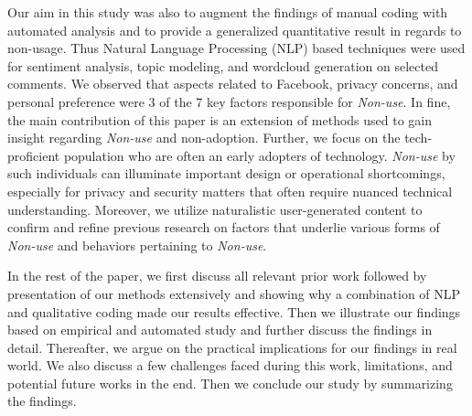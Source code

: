 Our aim in this study was also to augment the findings of manual coding with automated analysis and to provide a generalized quantitative result in regards to non-usage. Thus Natural Language Processing (NLP) based techniques were used for sentiment analysis, topic modeling, and wordcloud generation on selected comments. We observed that aspects related to Facebook, privacy concerns, and personal preference were 3 of the 7 key factors responsible for \emph{Non-use}. In fine, the main contribution of this paper is an extension of methods used to gain insight regarding \textit{Non-use} and non-adoption. Further, we focus on the tech-proficient population who are often an early adopters of technology. \emph{Non-use} by such individuals can illuminate important design or operational shortcomings, especially for privacy and security matters that often require nuanced technical understanding. Moreover, we utilize naturalistic user-generated content to confirm and refine previous research on factors that underlie various forms of \emph{Non-use} and behaviors pertaining to \emph{Non-use}. 


In the rest of the paper, we first discuss all relevant prior work followed by presentation of our methods extensively and showing why a combination of NLP and qualitative coding made our results effective. Then we illustrate our findings based on empirical and automated study and further discuss the findings in detail. Thereafter, we argue on the practical implications for our findings in real world. We also discuss a few challenges faced during this work, limitations, and potential future works in the end. Then we conclude our study by summarizing the findings. 




